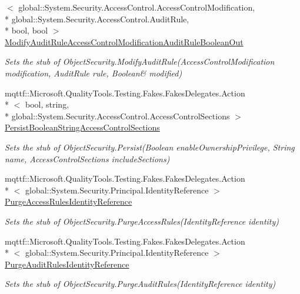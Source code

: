 \begin{DoxyCompactItemize}
$<$ global\-::\-System.\-Security.\-Access\-Control.\-Access\-Control\-Modification, \\*
global\-::\-System.\-Security.\-Access\-Control.\-Audit\-Rule, \\*
bool, bool $>$ \hyperlink{class_system_1_1_security_1_1_access_control_1_1_fakes_1_1_stub_native_object_security_a1dd75474973531c0c9f6cb486f6ce7a7}{Modify\-Audit\-Rule\-Access\-Control\-Modification\-Audit\-Rule\-Boolean\-Out}
\begin{DoxyCompactList}\small\item\em Sets the stub of Object\-Security.\-Modify\-Audit\-Rule(Access\-Control\-Modification modification, Audit\-Rule rule, Boolean\& modified)\end{DoxyCompactList}\item 
mqttf\-::\-Microsoft.\-Quality\-Tools.\-Testing.\-Fakes.\-Fakes\-Delegates.\-Action\\*
$<$ bool, string, \\*
global\-::\-System.\-Security.\-Access\-Control.\-Access\-Control\-Sections $>$ \hyperlink{class_system_1_1_security_1_1_access_control_1_1_fakes_1_1_stub_native_object_security_ab8c9e8ae905391f60318682c0f268e04}{Persist\-Boolean\-String\-Access\-Control\-Sections}
\begin{DoxyCompactList}\small\item\em Sets the stub of Object\-Security.\-Persist(\-Boolean enable\-Ownership\-Privilege, String name, Access\-Control\-Sections include\-Sections)\end{DoxyCompactList}\item 
mqttf\-::\-Microsoft.\-Quality\-Tools.\-Testing.\-Fakes.\-Fakes\-Delegates.\-Action\\*
$<$ global\-::\-System.\-Security.\-Principal.\-Identity\-Reference $>$ \hyperlink{class_system_1_1_security_1_1_access_control_1_1_fakes_1_1_stub_native_object_security_aec018d3a80a5b4fe8eb5d084818fd75b}{Purge\-Access\-Rules\-Identity\-Reference}
\begin{DoxyCompactList}\small\item\em Sets the stub of Object\-Security.\-Purge\-Access\-Rules(\-Identity\-Reference identity)\end{DoxyCompactList}\item 
mqttf\-::\-Microsoft.\-Quality\-Tools.\-Testing.\-Fakes.\-Fakes\-Delegates.\-Action\\*
$<$ global\-::\-System.\-Security.\-Principal.\-Identity\-Reference $>$ \hyperlink{class_system_1_1_security_1_1_access_control_1_1_fakes_1_1_stub_native_object_security_a9a32e4467378a6e8eb43b2591f36766b}{Purge\-Audit\-Rules\-Identity\-Reference}
\begin{DoxyCompactList}\small\item\em Sets the stub of Object\-Security.\-Purge\-Audit\-Rules(\-Identity\-Reference identity)\end{DoxyCompactList}\end{DoxyCompactItemize}
